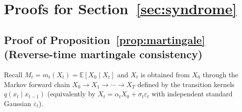 \documentclass{article}
\theoremstyle{plain}
\theoremstyle{definition}
\theoremstyle{remark}
\begin{document}
\section{Proofs for Section~\ref{sec:syndrome}}
\label{app:prop_mart}
\label{app:prop_syn}

\subsection{Proof of Proposition~\ref{prop:martingale}
            (Reverse-time martingale consistency)}

Recall \(M_t = m_t(X_t) = \mathbb{E}[X_0 \mid X_t]\) and \(X_t\) is obtained
from \(X_0\) through the Markov forward chain
\(X_0 \to X_1 \to \cdots \to X_T\) defined by the transition kernels
\(q(x_t\mid x_{t-1})\) (equivalently by
\(X_t = \alpha_t X_0 + \sigma_t\varepsilon_t\) with independent standard
Gaussian \(\varepsilon_t\)).
\end{document}

